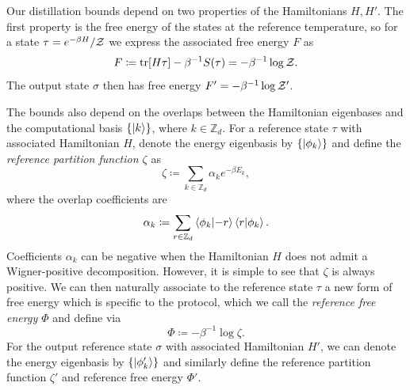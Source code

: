 \documentclass[pra,
aps,
twocolumn,
superscriptaddress,
groupedaddress,
nofootinbib,
reprint
]{revtex4-1}
\begin{document}
Our distillation bounds depend on two properties of the Hamiltonians $H, H'$.
The first property is the free energy of the states at the reference temperature, so for a state $\tau = e^{-\beta H}/\mathcal{Z}$ we express the associated free energy $F$ as
\begin{equation}
	F \coloneqq \mbox{tr}[H \tau] - \beta^{-1}S(\tau) = -\beta^{-1}\log{\mathcal{Z}}.
\end{equation}
The output state $\sigma$ then has free energy $F' = -\beta^{-1} \log \mathcal{Z}'$.

The bounds also depend on the overlaps between the Hamiltonian eigenbases and the computational basis $\{\ket{k}\}$, where $k \in \mathbb{Z}_d$.
For a reference state $\tau$ with associated Hamiltonian $H$, denote the energy eigenbasis by $\{\ket{\phi_k}\}$ and define the \emph{reference partition function $\zeta$} as
\begin{equation}
	\zeta \coloneqq \sum_{k \in \mathbb{Z}_d} \alpha_k e^{-\beta E_k},
\end{equation}
where the overlap coefficients are
\begin{equation}
	\alpha_k \coloneqq \sum_{r \in \mathbb{Z}_d} \braket{\phi_k}{-r}\braket{r}{\phi_k}.
\end{equation}
Coefficients $\alpha_k$ can be negative when the Hamiltonian $H$ does not admit a Wigner-positive decomposition. 
However, it is simple to see that $\zeta$ is always positive. 
We can then naturally associate to the reference state $\tau$ a new form of free energy which is specific to the protocol, which we call the \emph{reference free energy $\Phi$} and define via
\begin{equation}
	\Phi \coloneqq -\beta^{-1} \log \zeta.
\end{equation}
For the output reference state $\sigma$ with associated Hamiltonian $H'$, we can denote the energy eigenbasis by $\{\ket{\phi'_k}\}$ and similarly define the reference partition function $\zeta'$ and reference free energy $\Phi'$.
\end{document}
